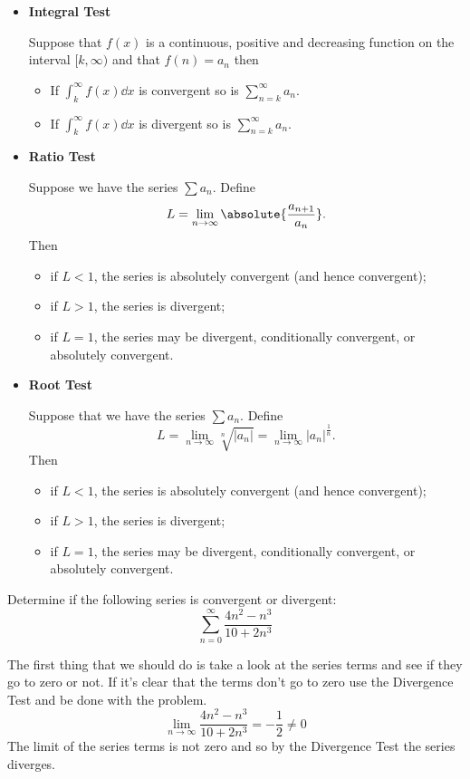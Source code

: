 \begin{itemize}
\item \textbf{Integral Test}

Suppose that $f(x)$ is a continuous, positive and decreasing function on the interval $[k,\infty)$ and that $f(n)=a_n$ then
\begin{itemize}
\item If $\int_k^\infty f(x)\dd{x}$ is convergent so is $\sum_{n=k}^\infty a_n$.
\item If $\int_k^\infty f(x)\dd{x}$ is divergent so is $\sum_{n=k}^\infty a_n$.
\end{itemize}

\item \textbf{Ratio Test}

Suppose we have the series $\sum a_n$. Define
\[ L=\lim_{n\to\infty}\absolute{\frac{a_{n+1}}{a_n}}. \]
Then
\begin{itemize}
\item if $L<1$, the series is absolutely convergent (and hence convergent);
\item if $L>1$, the series is divergent;
\item if $L=1$, the series may be divergent, conditionally convergent, or absolutely convergent.
\end{itemize}

\item \textbf{Root Test}

Suppose that we have the series $\sum a_n$. Define
\[ L = \lim_{n\to\infty}\sqrt[n]{|a_n|}=\lim_{n\to\infty}|a_n|^\frac{1}{n}. \]
Then
\begin{itemize}
\item if $L<1$, the series is absolutely convergent (and hence convergent);
\item if $L>1$, the series is divergent;
\item if $L=1$, the series may be divergent, conditionally convergent, or absolutely convergent.
\end{itemize}
\end{itemize}

\begin{exercise}{}{}
Determine if the following series is convergent or divergent:
\[ \sum_{n=0}^\infty  \frac{4n^2-n^3}{10+2n^3} \]
\end{exercise}

\begin{solution}
The first thing that we should do is take a look at the series terms and see if they go to zero or not. If it's clear that the terms don't go to zero use the Divergence Test and be done with the problem.
\[ \lim_{n\to\infty}\frac{4n^2-n^3}{10+2n^3}=-\frac{1}{2}\neq0 \]
The limit of the series terms is not zero and so by the Divergence Test the series diverges.
\end{solution}

